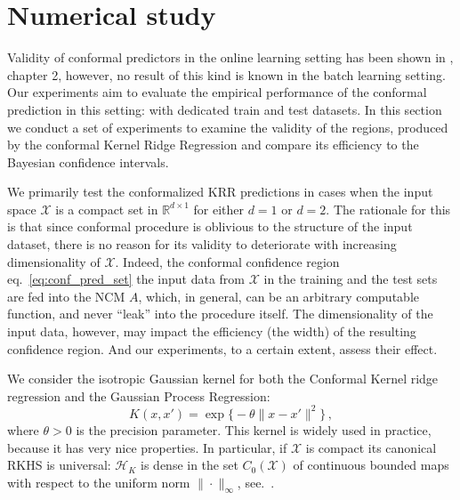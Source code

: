 \documentclass[a4paper,14pt]{extarticle}
\newcommand{\Hcal}{\mathcal{H}}
\newcommand{\Xcal}{\mathcal{X}}
\newcommand{\Real}{\mathbb{R}}
\begin{document}


\section{Numerical study} %
\label{sec:numerical_study}

Validity of conformal predictors in the online learning setting has been shown in
\cite{vovk2005}, chapter 2, however, no result of this kind is known in the batch
learning setting. Our experiments aim to evaluate the empirical performance of the
conformal prediction in this setting: with dedicated train and test datasets. In
this section we conduct a set of experiments to examine the validity of the regions,
produced by the conformal Kernel Ridge Regression and compare its efficiency to
the Bayesian confidence intervals.

We primarily test the conformalized KRR predictions in cases when the input space
$\Xcal$ is a compact set in $\Real^{d\times 1}$ for either $d=1$ or $d=2$. The rationale
for this is that since conformal procedure is oblivious to the structure of the
input dataset, there is no reason for its validity to deteriorate with increasing
dimensionality of $\Xcal$. Indeed, the conformal confidence region eq.~\ref{eq:conf_pred_set}
the input data from $\Xcal$ in the training and the test sets are fed into the NCM
$A$, which, in general, can be an arbitrary computable function, and never ``leak''
into the procedure itself. The dimensionality of the input data, however, may impact
the efficiency (the width) of the resulting confidence region. And our experiments,
to a certain extent, assess their effect.

We consider the isotropic Gaussian kernel for both the Conformal Kernel ridge regression
and the Gaussian Process Regression:
\begin{equation} \label{eq:gauss_kenrel}
  K(x,x')
  = \mathop{\text{exp}}\bigl\{-\theta \|x - x'\|^2\bigr\}
  \,,
\end{equation}
where $\theta>0$ is the precision parameter. This kernel is widely used in practice,
because it has very nice properties. In particular, if $\Xcal$ is compact its canonical
RKHS is universal: $\Hcal_K$ is dense in the set $C_0(\Xcal)$ of continuous bounded
maps with respect to the uniform norm $\|\cdot\|_\infty$, see.~\cite{steinwart2002}.

\end{document}
